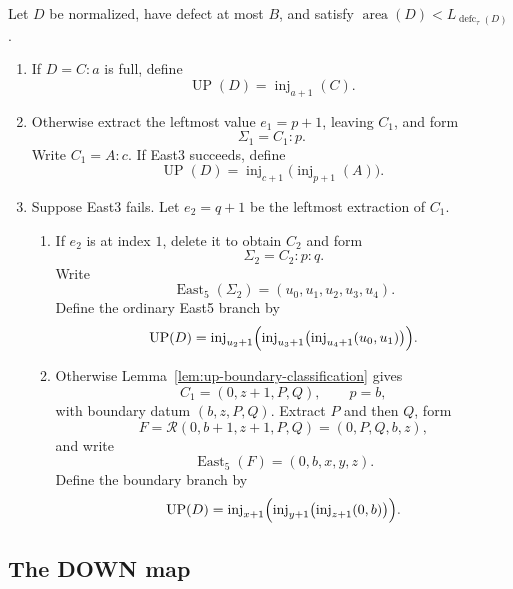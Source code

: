 \documentclass[11pt]{article}
\theoremstyle{definition}
\theoremstyle{remark}
\newcommand{\area}{\operatorname{area}}
\newcommand{\defc}{\operatorname{defc}}
\newcommand{\UP}{\operatorname{UP}}
\newcommand{\East}{\operatorname{East}}
\newcommand{\inj}{\operatorname{inj}}
\newcommand{\Repack}{\mathcal R}
\begin{document}
Let $D$ be normalized, have defect at most $B$, and satisfy
$\area(D)<L_{\defc_\tau(D)}$.
\begin{enumerate}
\item If $D=C:a$ is full, define
\begin{equation}
 \UP(D)=\inj_{a+1}(C).
 \label{eq:up-full}
\end{equation}
\item Otherwise extract the leftmost value $e_1=p+1$, leaving $C_1$, and
form
\[
 \Sigma_1=C_1:p.
\]
Write $C_1=A:c$.  If East3 succeeds, define
\begin{equation}
 \UP(D)=\inj_{c+1}\bigl(\inj_{p+1}(A)\bigr).
 \label{eq:up-east3}
\end{equation}
\item Suppose East3 fails.  Let $e_2=q+1$ be the leftmost extraction of
$C_1$.
  \begin{enumerate}
  \item If $e_2$ is at index $1$, delete it to obtain $C_2$ and form
  \[
    \Sigma_2=C_2:p:q.
  \]
  Write
  \[
    \East_5(\Sigma_2)=(u_0,u_1,u_2,u_3,u_4).
  \]
  Define the ordinary East5 branch by
  \begin{equation}
   \UP(D)=
   \inj_{u_2+1}\Bigl(
     \inj_{u_3+1}\bigl(
       \inj_{u_4+1}(u_0,u_1)
     \bigr)
   \Bigr).
   \label{eq:up-east5}
  \end{equation}
  \item Otherwise Lemma~\ref{lem:up-boundary-classification} gives
  \[
    C_1=(0,z+1,P,Q),
    \qquad p=b,
  \]
  with boundary datum $(b,z,P,Q)$.  Extract $P$ and then $Q$, form
  \[
    F=\Repack(0,b+1,z+1,P,Q)=(0,P,Q,b,z),
  \]
  and write
  \[
    \East_5(F)=(0,b,x,y,z).
  \]
  Define the boundary branch by
  \begin{equation}
    \UP(D)=
    \inj_{x+1}\Bigl(
      \inj_{y+1}\bigl(
        \inj_{z+1}(0,b)
      \bigr)
    \Bigr).
    \label{eq:up-boundary}
  \end{equation}
  \end{enumerate}
\end{enumerate}

\subsection{The DOWN map}
\end{document}
